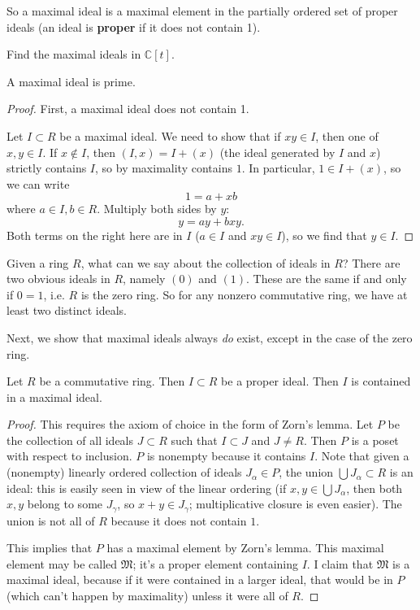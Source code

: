 So a maximal ideal is a maximal element in the partially ordered set of proper
ideals (an ideal is \textbf{proper} if it does not contain 1).

\begin{exercise} Find the maximal ideals in $\mathbb{C}[t]$. \end{exercise}

\begin{proposition} A maximal ideal is prime. \end{proposition} \begin{proof}
First, a maximal ideal does not contain 1.

Let $I \subset R$ be a maximal ideal. We need to show that if $xy \in I$, then
one of $x,y \in I$. If $x \notin I$, then $(I,x) = I + (x)$ (the ideal
generated by $I$ and $x$) strictly contains $I$, so by maximality contains $1$.
In particular, $1 \in I+(x)$, so we can write \[ 1 = a + xb \] where $a \in I,
b \in R$. Multiply both sides by $y$: \[ y = ay + bxy. \] Both terms on the
right here are in $I$ ($a \in I$ and $xy \in I$), so we find that $y \in I$.

\end{proof}

Given a ring $R$, what can we say about the collection of ideals in $R$? There
are two obvious ideals in $R$, namely $(0)$ and $ (1)$. These are the same if
and only if $0=1$, i.e. $R$ is the zero ring. So for any nonzero commutative
ring, we have at least two distinct ideals.

Next, we show that maximal ideals always \emph{do} exist, except in the case of
the zero ring. \begin{proposition} \label{anycontainedinmaximal} Let $R$ be a
commutative ring. Then $I \subset R$ be a proper ideal. Then $I$ is contained
in a maximal ideal. \end{proposition}

\begin{proof} This requires the axiom of choice in the form of Zorn's lemma.
Let $P$ be the collection of all ideals $J \subset R$ such that $I \subset J$
and $J \neq R$. Then $P$ is a poset with respect to inclusion. $P$ is nonempty
because it contains $I$. Note that given a (nonempty) linearly ordered
collection of ideals $J_{\alpha} \in P$, the union $\bigcup J_{\alpha} \subset
R$ is an ideal: this is easily seen in view of the linear ordering (if $x,y \in
\bigcup J_{\alpha}$, then both $x,y$ belong to some $J_{\gamma}$, so $x+y \in
J_{\gamma}$; multiplicative closure is even easier). The union is not all of
$R$ because it does not contain $1$.

This implies that $P$ has a maximal element by Zorn's lemma. This maximal
element may be called $\mathfrak{M}$; it's a proper element containing $I$. I
claim that $\mathfrak{M}$ is a maximal ideal, because if it were contained in a
larger ideal, that would be in $P$ (which can't happen by maximality) unless it
were all of $R$. \end{proof}

